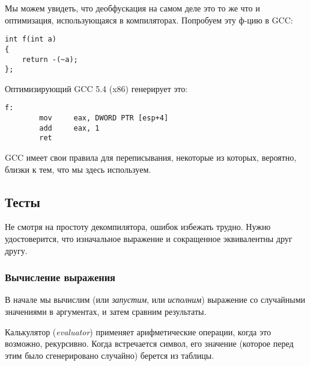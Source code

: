 Мы можем увидеть, что деобфускация на самом деле это то же что и оптимизация, использующаяся в компиляторах.
Попробуем эту ф-цию в GCC:

\begin{lstlisting}
int f(int a)
{
	return -(~a);
};
\end{lstlisting}

Оптимизирующий GCC 5.4 (x86) генерирует это:

\begin{lstlisting}
f:
        mov     eax, DWORD PTR [esp+4]
        add     eax, 1
        ret
\end{lstlisting}

GCC имеет свои правила для переписывания, некоторые из которых, вероятно, близки к тем, что мы здесь используем.

\subsection{Тесты}

Не смотря на простоту декомпилятора, ошибок избежать трудно.
Нужно удостоверится, что изначальное выражение и сокращенное эквивалентны друг другу.

\subsubsection{Вычисление выражения}

В начале мы вычислим (или \textit{запустим}, или \textit{исполним}) выражение со случайными значениями в аргументах,
и затем сравним результаты.

Калькулятор (\textit{evaluator}) применяет арифметические операции, когда это возможно, рекурсивно.
Когда встречается символ, его значение (которое перед этим было сгенерировано случайно) берется из таблицы.

